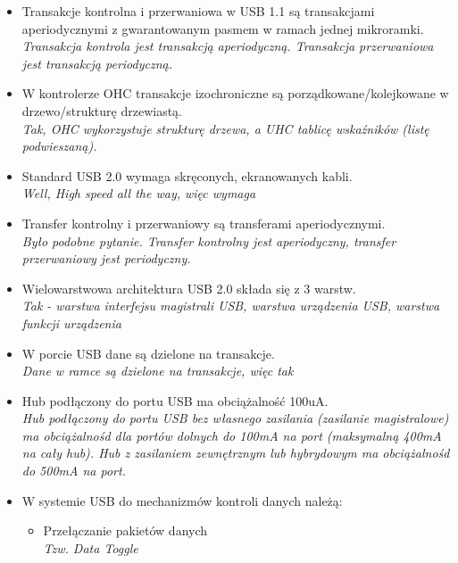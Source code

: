 \begin{itemize}
	\item \textcolor{nie}{Transakcje kontrolna i przerwaniowa w USB 1.1 są transakcjami aperiodycznymi z gwarantowanym pasmem w ramach jednej mikroramki.} \\
	{\small \emph{Transakcja kontrola jest transakcją aperiodyczną. Transakcja przerwaniowa jest transakcją periodyczną.}}
	
	\item \textcolor{tak}{W kontrolerze OHC transakcje izochroniczne są porządkowane/kolejkowane w drzewo/strukturę drzewiastą.} \\
	{\small \emph{Tak, OHC wykorzystuje strukturę drzewa, a UHC tablicę wskaźników (listę podwieszaną).}}
	
	\item \textcolor{tak}{Standard USB 2.0 wymaga skręconych, ekranowanych kabli.} \\
	{\small \emph{Well, High speed all the way, więc wymaga}}
	
	\item \textcolor{nie}{Transfer kontrolny i przerwaniowy są transferami aperiodycznymi.} \\
	{\small \emph{Było podobne pytanie. Transfer kontrolny jest aperiodyczny, transfer przerwaniowy jest periodyczny.}}
	
	\item \textcolor{tak}{Wielowarstwowa architektura USB 2.0 składa się z 3 warstw.} \\
	{\small \emph{Tak - warstwa interfejsu magistrali USB, warstwa urządzenia USB, warstwa funkcji urządzenia}}
	
	\item \textcolor{tak}{W porcie USB dane są dzielone na transakcje.} \\
	{\small \emph{Dane w ramce są dzielone na transakcje, więc tak}}
	
	\item \textcolor{nie}{Hub podłączony do portu USB ma obciążalność 100uA.} \\
	{\small \emph{Hub podłączony do portu USB bez własnego zasilania (zasilanie magistralowe) ma obciążalnośd dla portów dolnych do 100mA na port (maksymalną 400mA na cały hub). Hub z zasilaniem zewnętrznym lub hybrydowym ma obciążalnośd do 500mA na port.}}
	
	\item {W systemie USB do mechanizmów kontroli danych należą:}
	\begin{itemize}
		\item \textcolor{tak}{Przełączanie pakietów danych} \\
		{\small \emph{Tzw. Data Toggle}}
		

\end{itemize}
\end{itemize}
